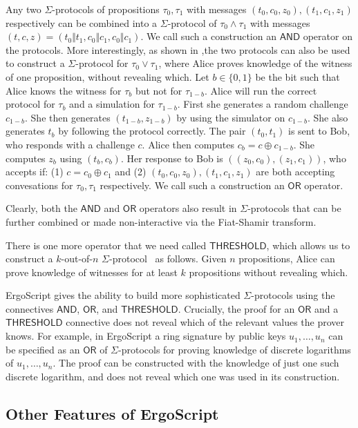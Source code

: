 \documentclass[11pt]{article}
\newcommand{\langname}{ErgoScript\xspace}
\newcommand{\andnode}{\ensuremath{\mathsf{AND}}}
\newcommand{\ornode}{\ensuremath{\mathsf{OR}}}
\newcommand{\tnode}{\ensuremath{\mathsf{THRESHOLD}}}
\begin{document}
Any two $\Sigma$-protocols of propositions $\tau_0, \tau_1$ with messages $(t_0, c_0, z_0), (t_1, c_1, z_1)$ respectively can be combined into a $\Sigma$-protocol of $\tau_0 \land \tau_1$ with messages $(t, c, z) = (t_0\Vert t_1,c_0\Vert c_1, c_0\Vert c_1)$. We call such a construction an $\andnode$ operator on the protocols. 
More interestingly, as shown in \cite{CDS94},the two protocols can also be used to construct a $\Sigma$-protocol for $\tau_0\lor \tau_1$, where Alice proves knowledge of the witness of one proposition, without revealing which. Let $b\in \{0, 1\}$ be the bit such that Alice knows the witness for $\tau_b$ but not for $\tau_{1-b}$. Alice will run the correct protocol for $\tau_b$ and a simulation for $\tau_{1-b}$. First she generates a random challenge $c_{1-b}$. She then generates $(t_{1-b}, z_{1-b})$ by using the simulator on $c_{1-b}$. She also generates $t_b$ by following the protocol correctly. The pair $(t_0, t_1)$ is sent to Bob, who responds with a challenge $c$. Alice then computes $c_b = c\oplus c_{1-b}$. She computes $z_b$ using $(t_b, c_b)$. Her response to Bob is $((z_0, c_0), (z_1, c_1))$, who accepts if: (1) $c = c_0 \oplus c_1$ and (2) $(t_0, c_0, z_0), (t_1, c_1, z_1)$ are both accepting convesations for $\tau_0, \tau_1$ respectively. We call such a construction an $\ornode$ operator. 

Clearly, both the $\andnode$ and $\ornode$ operators also result in $\Sigma$-protocols that can be further combined or made non-interactive via the Fiat-Shamir transform. 

There is one more operator that we need called $\tnode$, which allows us to construct a $k$-out-of-$n$ $\Sigma$-protocol~\cite{CDS94} as follows. Given $n$ propositions, Alice can prove knowledge of witnesses for at least $k$ propositions without revealing which. 

\langname gives the ability to build more sophisticated $\Sigma$-protocols using the connectives $\andnode$, $\ornode$, and $\tnode$. 
Crucially, the proof for an $\ornode$ and a $\tnode$ connective does not reveal which of the relevant values the prover knows. For example, in \langname a ring signature by public keys $u_1, \dots, u_n$ can be specified as an $\ornode$ of $\Sigma$-protocols for proving knowledge of discrete logarithms of $u_1, \dots, u_n$. The proof can be constructed with the knowledge of just one such discrete logarithm, and does not reveal which one was used in its construction. 

\subsection{Other Features of \langname} 
\end{document}
